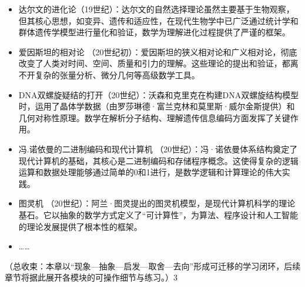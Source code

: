 \begin{itemize}
\item 达尔文的进化论（19世纪）：达尔文的自然选择理论虽然主要基于生物观察，但其核心思想，如变异、遗传和适应性，在现代生物学中已广泛通过统计学和群体遗传学模型进行量化和验证，数学为理解进化过程提供了严谨的框架。
\item 爱因斯坦的相对论 （20世纪初）：爱因斯坦的狭义相对论和广义相对论，彻底改变了人类对时间、空间、质量和引力的理解。这些理论的提出和验证，都离不开复杂的张量分析、微分几何等高级数学工具。
\item DNA双螺旋疑结的打开（20世纪）：沃森和克里克在构建DNA双螺旋结构模型时，运用了晶体学数据（由罗莎琳德·富兰克林和莫里斯·威尔金斯提供）和几何对称性原理。数学在解析分子结构、理解遗传信息编码方面发挥了关键作用。
\item 冯.诺依曼的二进制编码和现代计算机 （20世纪）：冯·诺依曼体系结构奠定了现代计算机的基础，其核心是二进制编码和存储程序概念。这使得复杂的逻辑运算和数据处理能够通过简单的0和1进行，是数学逻辑和计算理论的伟大实践。
\item 图灵机 （20世纪）：阿兰·图灵提出的图灵机模型，是现代计算机科学的理论基石。它以抽象的数学方式定义了“可计算性”，为算法、程序设计和人工智能的理论发展提供了根本性的框架。
\item ……
\end{itemize}
{（总收束：本章以“现象—抽象—启发—取舍—去向”形成可迁移的学习闭环，后续章节将据此展开各模块的可操作细节与练习。）}3


\newpage
